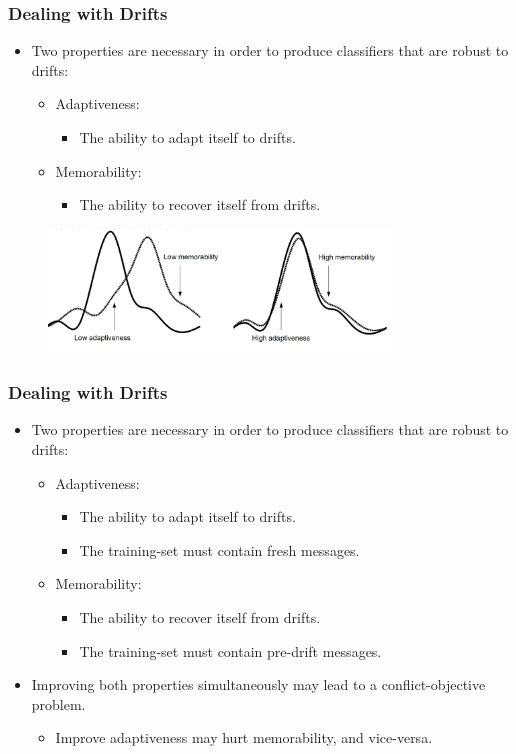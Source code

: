 \documentclass[14pt]{beamer}
\begin{document}
\begin{frame}\frametitle{Dealing with Drifts}

\begin{itemize}
\item Two properties are necessary in order to produce classifiers that are robust to drifts:
\begin{itemize}
\item Adaptiveness:
\begin{itemize}
\item The ability to adapt itself to drifts.
\end{itemize}
\item Memorability:
\begin{itemize}
\item The ability to recover itself from drifts.
\end{itemize}
\end{itemize}
\end{itemize}

\begin{figure}
\centering
\includegraphics[height=1.30in]{drift3}
\end{figure}
\end{frame}

\begin{frame}\frametitle{Dealing with Drifts}

\begin{itemize}
\item Two properties are necessary in order to produce classifiers that are robust to drifts:
\begin{itemize}
\item Adaptiveness:
\begin{itemize}
\item The ability to adapt itself to drifts.
\item The training-set must contain fresh messages.
\end{itemize}
\item Memorability:
\begin{itemize}
\item The ability to recover itself from drifts.
\item The training-set must contain pre-drift messages.
\end{itemize}
\end{itemize}
\item Improving both properties simultaneously may lead to a conflict-objective problem.
\begin{itemize}
\item Improve adaptiveness may hurt memorability, and vice-versa.
\end{itemize}
\end{itemize}

\end{frame}
\end{document}
